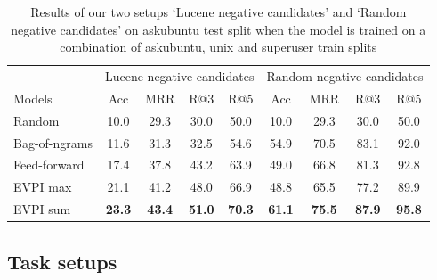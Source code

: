 \documentclass[11pt,a4paper]{article}
\begin{document}


\begin{table}[t]
	\small
	\centering
	\begin{tabular}{l|cccc|cccc}
		\toprule
		& \multicolumn{4}{c|}{Lucene negative candidates} & \multicolumn{4}{c}{Random negative candidates} \\
		Models & Acc & MRR & R@3 & R@5 & Acc & MRR & R@3 & R@5\\
		\midrule
		Random  & 10.0 & 29.3 & 30.0 & 50.0 &10.0 & 29.3 & 30.0 & 50.0 \\
		Bag-of-ngrams & 11.6 & 31.3 & 32.5 & 54.6 & 54.9 & 70.5 & 83.1 & 92.0 \\
		Feed-forward & 17.4 & 37.8 & 43.2 & 63.9 &  49.0 & 66.8 & 81.3 & 92.8 \\
		EVPI max  & 21.1 & 41.2 & 48.0 & 66.9  & 48.8 & 65.5 & 77.2 & 89.9 \\
		EVPI sum & \bf 23.3 & \bf 43.4 & \bf 51.0 & \bf 70.3 & \bf 61.1 & \bf 75.5 & \bf 87.9  & \bf 95.8  \\
		\bottomrule
	\end{tabular}
	\label{results_topN}
	\caption{Results of our two setups `Lucene negative candidates' and `Random negative candidates' on askubuntu test split when the model is trained on a combination of askubuntu, unix and superuser train splits}
\end{table}


\subsection{Task setups}\label{task_setup}
\end{document}
